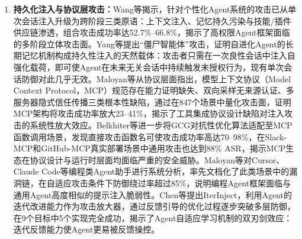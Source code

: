 \begin{enumerate}
  \item \textbf{持久化注入与协议层攻击：}Wang等\cite{wang2026froma}揭示，针对个性化Agent系统的攻击已从单次会话注入升级为跨阶段三类原语：上下文注入、记忆持久污染与技能/插件供应链渗透，组合攻击成功率达52.7\%--66.8\%，揭示了高权限Agent框架面临的多阶段立体攻击面。Yang等\cite{yang2026zombie}提出“僵尸智能体”攻击，证明自进化Agent的长期记忆机制构成持久性注入的天然载体：攻击者只需在一次良性会话中注入自强化载荷，即可使Agent在未来无关会话中持续触发未授权行为，现有单次会话防御对此几乎无效。Maloyan等\cite{maloyan2026breaking}从协议层面指出，模型上下文协议（Model Context Protocol，MCP）规范存在能力证明缺失、双向采样无来源认证、多服务器隐式信任传播三类根本性缺陷，通过在847个场景中量化攻击面，证明MCP架构将攻击成功率放大23--41\%，揭示了工具集成协议设计缺陷对注入攻击的系统性放大效应。Belkhiter等\cite{belkhiter2026breaking}进一步将GCG对抗性优化算法适配至MCP函数调用场景，发现直接攻击函数名可使攻击成功率高达70--98\%，在Slack-MCP和GitHub-MCP真实部署场景中通用攻击也达到88\% ASR，揭示MCP生态在协议设计与运行时层面均面临严重的安全威胁。Maloyan等\cite{maloyan2026prompt}对Cursor、Claude Code等编程类Agent助手进行系统分析，率先文档化了此类场景中的漏洞链，在自适应攻击条件下防御绕过率超过85\%，说明编程Agent框架面临与通用Agent高度相似的提示注入脆弱性。Chen等\cite{chen2026iterinjectindirectpromptinjection}提出IterInject，利用Agent的迭代改进能力作为攻击放大器，通过反馈引导的优化过程逐步突破多层防御，在9个目标中5个实现完全成功，揭示了Agent自适应学习机制的双刃剑效应：迭代反馈能力使Agent更易被反馈操控。
\end{enumerate}

